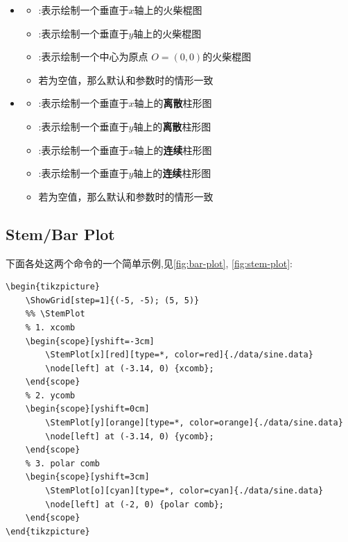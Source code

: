 \begin{multicols}{2}
\begin{itemize}
    \item \cmd{\StemPlot}
        \begin{itemize}
            \item {}:表示绘制一个垂直于$x$轴上的火柴棍图
            \item {}:表示绘制一个垂直于$y$轴上的火柴棍图
            \item {}:表示绘制一个中心为原点 $O=(0,0)$的火柴棍图
            \item 若为空值，那么默认和参数时的情形一致
        \end{itemize}
    \item \cmd{\BarPlot}
        \begin{itemize}
            \item {}:表示绘制一个垂直于$x$轴上的{\bf 离散}柱形图
            \item {}:表示绘制一个垂直于$y$轴上的{\bf 离散}柱形图
            \item {}:表示绘制一个垂直于$x$轴上的{\bf 连续}柱形图
            \item {}:表示绘制一个垂直于$y$轴上的{\bf 连续}柱形图
            \item 若为空值，那么默认和参数时的情形一致
        \end{itemize}
\end{itemize}
\end{multicols}

\subsection{Stem/Bar Plot}
下面各处这两个命令的一个简单示例,见\cref{fig:bar-plot}, \cref{fig:stem-plot}:
\begin{verbatim}
\begin{tikzpicture}
    \ShowGrid[step=1]{(-5, -5); (5, 5)}
    %% \StemPlot
    % 1. xcomb
    \begin{scope}[yshift=-3cm]
        \StemPlot[x][red][type=*, color=red]{./data/sine.data}
        \node[left] at (-3.14, 0) {xcomb};
    \end{scope}
    % 2. ycomb
    \begin{scope}[yshift=0cm]
        \StemPlot[y][orange][type=*, color=orange]{./data/sine.data}
        \node[left] at (-3.14, 0) {ycomb};
    \end{scope}
    % 3. polar comb
    \begin{scope}[yshift=3cm]
        \StemPlot[o][cyan][type=*, color=cyan]{./data/sine.data}
        \node[left] at (-2, 0) {polar comb};
    \end{scope}
\end{tikzpicture}
\end{verbatim}

